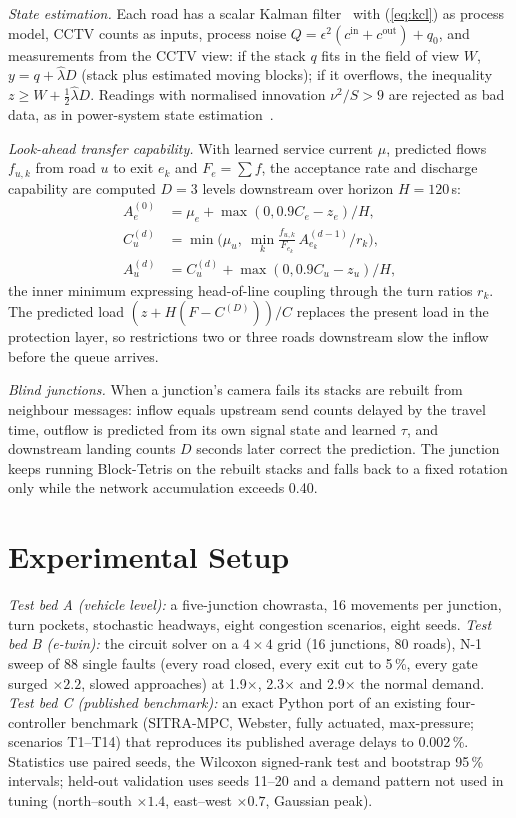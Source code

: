 \documentclass[journal]{IEEEtran}
\begin{document}
\emph{State estimation.} Each road has a scalar Kalman filter~\cite{kalman1960} with
(\ref{eq:kcl}) as process model, CCTV counts as inputs, process noise
$Q=\epsilon^2(c^{\mathrm{in}}+c^{\mathrm{out}})+q_0$, and measurements from the CCTV
view: if the stack $q$ fits in the field of view $W$, $y=q+\hat\lambda D$ (stack plus
estimated moving blocks); if it overflows, the inequality $z\ge W+\tfrac12\hat\lambda D$.
Readings with normalised innovation $\nu^2/S>9$ are rejected as bad data, as in
power-system state estimation~\cite{abur2004se}.

\emph{Look-ahead transfer capability.} With learned service current $\mu$, predicted
flows $f_{u,k}$ from road $u$ to exit $e_k$ and $F_e=\sum f$, the acceptance rate and
discharge capability are computed $D=3$ levels downstream over horizon $H=120$\,s:
\begin{align}
A_e^{(0)}&=\mu_e+\max(0,0.9C_e-z_e)/H,\\
C_u^{(d)}&=\min\Big(\mu_u,\ \min_k \tfrac{f_{u,k}}{F_{e_k}}\,A_{e_k}^{(d-1)}/r_k\Big),\\
A_u^{(d)}&=C_u^{(d)}+\max(0,0.9C_u-z_u)/H,
\end{align}
the inner minimum expressing head-of-line coupling through the turn ratios $r_k$. The
predicted load $(z+H(F-C^{(D)}))/C$ replaces the present load in the protection layer,
so restrictions two or three roads downstream slow the inflow before the queue arrives.

\emph{Blind junctions.} When a junction's camera fails its stacks are rebuilt from
neighbour messages: inflow equals upstream send counts delayed by the travel time,
outflow is predicted from its own signal state and learned $\tau$, and downstream
landing counts $D$ seconds later correct the prediction. The junction keeps running
Block-Tetris on the rebuilt stacks and falls back to a fixed rotation only while the
network accumulation exceeds 0.40.

\section{Experimental Setup}
\emph{Test bed A (vehicle level):} a five-junction chowrasta, 16 movements per junction,
turn pockets, stochastic headways, eight congestion scenarios, eight seeds.
\emph{Test bed B (e-twin):} the circuit solver on a $4\times4$ grid (16 junctions,
80 roads), N-1 sweep of 88 single faults (every road closed, every exit cut to 5\,\%,
every gate surged $\times2.2$, slowed approaches) at 1.9$\times$, 2.3$\times$ and
2.9$\times$ the normal demand. \emph{Test bed C (published benchmark):} an exact Python
port of an existing four-controller benchmark (SITRA-MPC, Webster, fully actuated,
max-pressure; scenarios T1--T14) that reproduces its published average delays to
0.002\,\%. Statistics use paired seeds, the Wilcoxon signed-rank test and bootstrap
95\,\% intervals; held-out validation uses seeds 11--20 and a demand pattern not used in
tuning (north--south $\times1.4$, east--west $\times0.7$, Gaussian peak).
\end{document}
